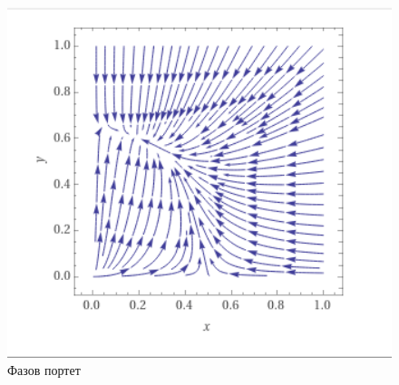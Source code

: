 \documentclass[a4paper,fleqn,12pt]{article}
\begin{document}
\newpage
\begin{figure}[htp!]
\includegraphics [width=6in]{fazof-portret-primer-1.png}
\caption{Фазов портет}
\end{figure}

\newpage
\end{document}
